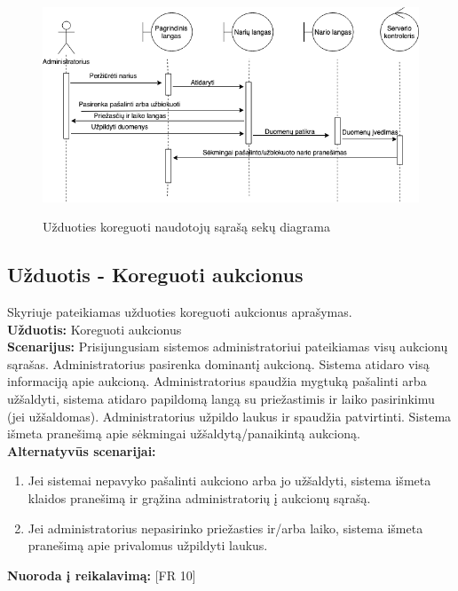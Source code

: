 \documentclass{VUMIFPSkursinis}
\begin{document}
	
		\begin{figure}[H]
		\centering
		\includegraphics[width=\linewidth]{img/editUsersAdminSequence.png}
		\label{fig:salinti}
		\caption{Užduoties koreguoti naudotojų sąrašą sekų diagrama}
	\end{figure}

	\subsection{Užduotis - Koreguoti aukcionus}
	Skyriuje pateikiamas užduoties koreguoti aukcionus aprašymas.\\
	\textbf{Užduotis:}  Koreguoti aukcionus \\
	\textbf{Scenarijus:} Prisijungusiam sistemos administratoriui pateikiamas visų aukcionų sąrašas. Administratorius pasirenka dominantį aukcioną. Sistema atidaro visą informaciją apie aukcioną. Administratorius spaudžia mygtuką pašalinti arba užšaldyti, sistema atidaro papildomą langą su priežastimis ir laiko pasirinkimu (jei užšaldomas). Administratorius užpildo laukus ir spaudžia patvirtinti. Sistema išmeta pranešimą apie sėkmingai užšaldytą/panaikintą aukcioną.\\
	\textbf{Alternatyvūs scenarijai:}
	\begin{enumerate}
		\item Jei sistemai nepavyko pašalinti aukciono arba jo užšaldyti, sistema išmeta klaidos pranešimą ir grąžina administratorių į aukcionų sąrašą.
		\item Jei administratorius nepasirinko priežasties ir/arba laiko, sistema išmeta pranešimą apie privalomus užpildyti laukus.
	\end{enumerate}
	\textbf{Nuoroda į reikalavimą: } [FR 10]
	
\end{document}
